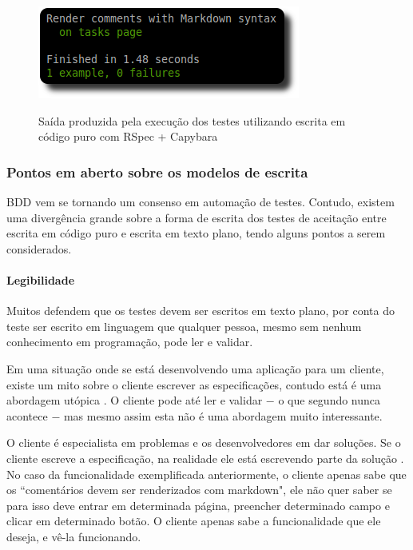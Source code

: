 \begin{figure}[h]
  \center
  \caption{Saída produzida pela execução dos testes utilizando escrita em código puro com RSpec + Capybara}
  \includegraphics[scale=0.6]{images/rspec-acceptance-exec}
  \label{img:rspec-acceptance-exec}
\end{figure}


\subsubsection{Pontos em aberto sobre os modelos de escrita}
\label{ssub:pontos_em_aberto}

BDD vem se tornando um consenso em automação de testes. Contudo, existem uma divergência grande sobre a forma de escrita dos testes de aceitação entre escrita em código puro e escrita em texto plano, tendo alguns pontos a serem considerados.


\paragraph{Legibilidade}
\label{sssub:legibilidade}

Muitos defendem que os testes devem ser escritos em texto plano, por conta do teste ser escrito em linguagem que qualquer pessoa, mesmo sem nenhum conhecimento em programação, pode ler e validar.

Em uma situação onde se está desenvolvendo uma aplicação para um cliente, existe um mito sobre o cliente escrever as especificações, contudo está é uma abordagem utópica \cite{SteakOverCucumber, CucumberForVegetarians, ClientsWritingCucumber}. O cliente pode até ler e validar $-$ o que segundo  nunca acontece $-$ mas mesmo assim esta não é uma abordagem muito interessante.

O cliente é especialista em problemas e os desenvolvedores em dar soluções. Se o cliente escreve a especificação, na realidade ele está escrevendo parte da solução \cite{SteakOverCucumber}. No caso da funcionalidade exemplificada anteriormente, o cliente apenas sabe que os ``comentários devem ser renderizados com markdown", ele não quer saber se para isso deve entrar em determinada página, preencher determinado campo e clicar em determinado botão. O cliente apenas sabe a funcionalidade que ele deseja, e vê-la funcionando.

